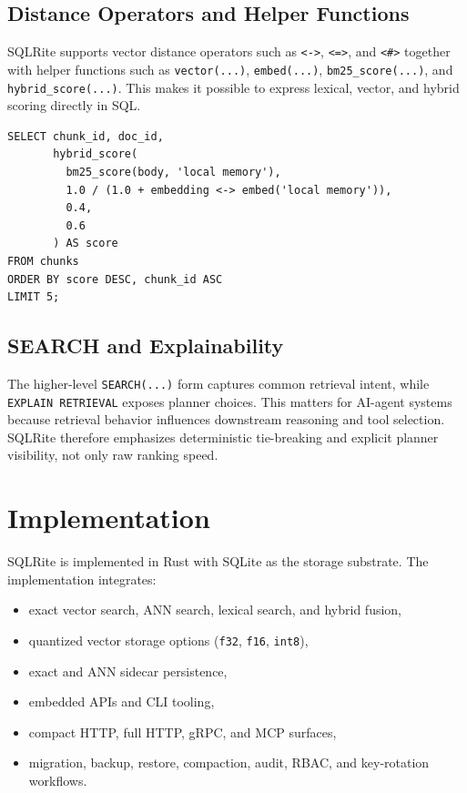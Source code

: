 \documentclass[11pt]{article}
\begin{document}
\subsection{Distance Operators and Helper Functions}
SQLRite supports vector distance operators such as \texttt{<->}, \texttt{<=>}, and \texttt{<\#>} together with helper functions such as \texttt{vector(...)}, \texttt{embed(...)}, \texttt{bm25\_score(...)}, and \texttt{hybrid\_score(...)}. This makes it possible to express lexical, vector, and hybrid scoring directly in SQL.

\begin{lstlisting}[language=SQLRiteSQL, caption={Example hybrid retrieval query in SQLRite.}]
SELECT chunk_id, doc_id,
       hybrid_score(
         bm25_score(body, 'local memory'),
         1.0 / (1.0 + embedding <-> embed('local memory')),
         0.4,
         0.6
       ) AS score
FROM chunks
ORDER BY score DESC, chunk_id ASC
LIMIT 5;
\end{lstlisting}

\subsection{SEARCH and Explainability}
The higher-level \texttt{SEARCH(...)} form captures common retrieval intent, while \texttt{EXPLAIN RETRIEVAL} exposes planner choices. This matters for AI-agent systems because retrieval behavior influences downstream reasoning and tool selection. SQLRite therefore emphasizes deterministic tie-breaking and explicit planner visibility, not only raw ranking speed.

\section{Implementation}
SQLRite is implemented in Rust with SQLite as the storage substrate. The implementation integrates:
\begin{itemize}[leftmargin=*, itemsep=0.2em]
  \item exact vector search, ANN search, lexical search, and hybrid fusion,
  \item quantized vector storage options (\texttt{f32}, \texttt{f16}, \texttt{int8}),
  \item exact and ANN sidecar persistence,
  \item embedded APIs and CLI tooling,
  \item compact HTTP, full HTTP, gRPC, and MCP surfaces,
  \item migration, backup, restore, compaction, audit, RBAC, and key-rotation workflows.
\end{itemize}
\end{document}
